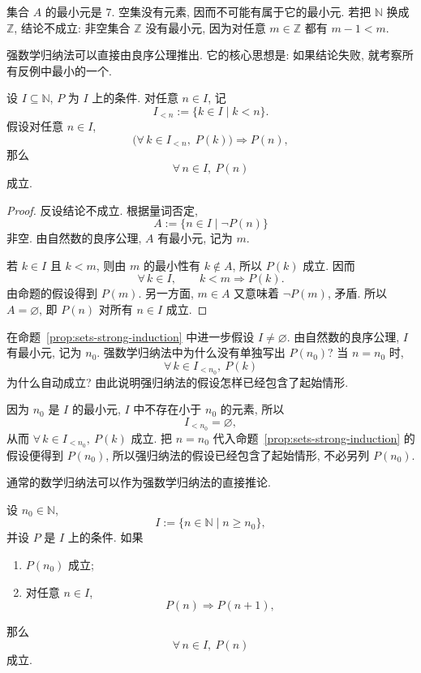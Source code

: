 \documentclass[usesamecnt, thmcnt=section, lang=cn, newtx, 10pt, scheme=chinese]{elegantbook}
\begin{document}
\begin{solution}
集合 $A$ 的最小元是 $7$. 空集没有元素, 因而不可能有属于它的最小元. 若把 $\mathbb N$ 换成 $\mathbb Z$, 结论不成立: 非空集合 $\mathbb Z$ 没有最小元, 因为对任意 $m\in\mathbb Z$ 都有 $m-1<m$.
\end{solution}

强数学归纳法可以直接由良序公理推出. 它的核心思想是: 如果结论失败, 就考察所有反例中最小的一个.

\begin{proposition}\label{prop:sets-strong-induction}
设 $I\subseteq\mathbb N$, $P$ 为 $I$ 上的条件. 对任意 $n\in I$, 记
\[
 I_{<n}:=\{k\in I\mid k<n\}.
\]
假设对任意 $n\in I$,
\[
 \big(\forall\,k\in I_{<n},\; P(k)\big)\Longrightarrow P(n),
\]
那么
\[
 \forall\,n\in I,\ P(n)
\]
成立.
\end{proposition}

\begin{proof}
反设结论不成立. 根据量词否定,
\[
 A:=\{n\in I\mid \neg P(n)\}
\]
非空. 由自然数的良序公理, $A$ 有最小元, 记为 $m$.

若 $k\in I$ 且 $k<m$, 则由 $m$ 的最小性有 $k\notin A$, 所以 $P(k)$ 成立. 因而
\[
 \forall\,k\in I,\qquad k<m\Rightarrow P(k).
\]
由命题的假设得到 $P(m)$. 另一方面, $m\in A$ 又意味着 $\neg P(m)$, 矛盾. 所以 $A=\varnothing$, 即 $P(n)$ 对所有 $n\in I$ 成立.
\end{proof}

\begin{concept}\label{con:sets-strong-base}
在命题~\ref{prop:sets-strong-induction} 中进一步假设 $I\neq\varnothing$. 由自然数的良序公理, $I$ 有最小元, 记为 $n_0$. 强数学归纳法中为什么没有单独写出 $P(n_0)$? 当 $n=n_0$ 时,
\[
 \forall\,k\in I_{<n_0},\ P(k)
\]
为什么自动成立? 由此说明强归纳法的假设怎样已经包含了起始情形.
\end{concept}

\begin{solution}
因为 $n_0$ 是 $I$ 的最小元, $I$ 中不存在小于 $n_0$ 的元素, 所以
\[
 I_{<n_0}=\varnothing,
\]
从而 $\forall\,k\in I_{<n_0},\ P(k)$ 成立. 把 $n=n_0$ 代入命题~\ref{prop:sets-strong-induction} 的假设便得到 $P(n_0)$, 所以强归纳法的假设已经包含了起始情形, 不必另列 $P(n_0)$.
\end{solution}

通常的数学归纳法可以作为强数学归纳法的直接推论.

\begin{corollary}\label{cor:sets-induction}
设 $n_0\in\mathbb N$,
\[
 I:=\{n\in\mathbb N\mid n\geq n_0\},
\]
并设 $P$ 是 $I$ 上的条件. 如果
\begin{enumerate}[label=\rm(\arabic*)]
  \item $P(n_0)$ 成立;
  \item 对任意 $n\in I$,
  \[
   P(n)\Rightarrow P(n+1),
  \]
\end{enumerate}
那么
\[
 \forall\,n\in I,\ P(n)
\]
成立.
\end{corollary}
\end{document}
